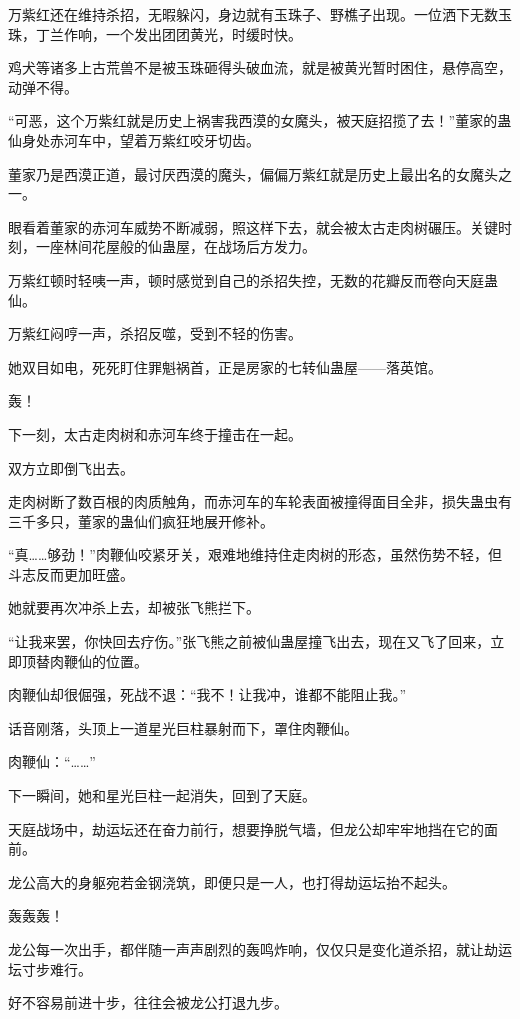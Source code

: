 \begin{this_body}
万紫红还在维持杀招，无暇躲闪，身边就有玉珠子、野樵子出现。一位洒下无数玉珠，丁兰作响，一个发出团团黄光，时缓时快。

鸡犬等诸多上古荒兽不是被玉珠砸得头破血流，就是被黄光暂时困住，悬停高空，动弹不得。

“可恶，这个万紫红就是历史上祸害我西漠的女魔头，被天庭招揽了去！”董家的蛊仙身处赤河车中，望着万紫红咬牙切齿。

董家乃是西漠正道，最讨厌西漠的魔头，偏偏万紫红就是历史上最出名的女魔头之一。

眼看着董家的赤河车威势不断减弱，照这样下去，就会被太古走肉树碾压。关键时刻，一座林间花屋般的仙蛊屋，在战场后方发力。

万紫红顿时轻咦一声，顿时感觉到自己的杀招失控，无数的花瓣反而卷向天庭蛊仙。

万紫红闷哼一声，杀招反噬，受到不轻的伤害。

她双目如电，死死盯住罪魁祸首，正是房家的七转仙蛊屋——落英馆。

轰！

下一刻，太古走肉树和赤河车终于撞击在一起。

双方立即倒飞出去。

走肉树断了数百根的肉质触角，而赤河车的车轮表面被撞得面目全非，损失蛊虫有三千多只，董家的蛊仙们疯狂地展开修补。

“真……够劲！”肉鞭仙咬紧牙关，艰难地维持住走肉树的形态，虽然伤势不轻，但斗志反而更加旺盛。

她就要再次冲杀上去，却被张飞熊拦下。

“让我来罢，你快回去疗伤。”张飞熊之前被仙蛊屋撞飞出去，现在又飞了回来，立即顶替肉鞭仙的位置。

肉鞭仙却很倔强，死战不退：“我不！让我冲，谁都不能阻止我。”

话音刚落，头顶上一道星光巨柱暴射而下，罩住肉鞭仙。

肉鞭仙：“……”

下一瞬间，她和星光巨柱一起消失，回到了天庭。

天庭战场中，劫运坛还在奋力前行，想要挣脱气墙，但龙公却牢牢地挡在它的面前。

龙公高大的身躯宛若金钢浇筑，即便只是一人，也打得劫运坛抬不起头。

轰轰轰！

龙公每一次出手，都伴随一声声剧烈的轰鸣炸响，仅仅只是变化道杀招，就让劫运坛寸步难行。

好不容易前进十步，往往会被龙公打退九步。


\end{this_body}
